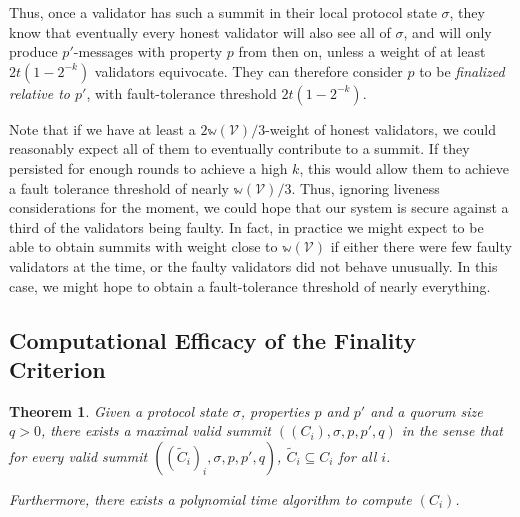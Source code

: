\documentclass[12pt, fleqn]{article}
\newtheorem{theorem}{Theorem}
\newcommand{\ww}{\mathbb{w}}
\begin{document}
Thus, once a validator has such a summit in their local protocol state $\sigma$, they know that eventually every honest validator will also see all of $\sigma$, and will only produce $p'$-messages with property $p$ from then on, unless a weight of at least $2t (1 - 2^{-k})$ validators equivocate. They can therefore consider $p$ to be \emph{finalized relative to $p'$}, with fault-tolerance threshold $2t (1 - 2^{-k})$.

Note that if we have at least a $2\ww(\mathcal{V})/3$-weight of honest validators, we could reasonably expect all of them to eventually contribute to a summit. If they persisted for enough rounds to achieve a high $k$, this would allow them to achieve a fault tolerance threshold of nearly $\ww(\mathcal{V})/3$. Thus, ignoring liveness considerations for the moment, we could hope that our system is secure against a third of the validators being faulty. In fact, in practice we might expect to be able to obtain summits with weight close to $\ww(\mathcal{V})$ if either there were few faulty validators at the time, or the faulty validators did not behave unusually. In this case, we might hope to obtain a fault-tolerance threshold of nearly everything.


\subsection{Computational Efficacy of the Finality Criterion}

\begin{theorem}
  Given a protocol state $\sigma$, properties $p$ and $p'$ and a quorum size $q > 0$, there exists a maximal valid summit $((C_i), \sigma, p, p', q)$ in the sense that for every valid summit $((\tilde{C}_i)_i, \sigma, p, p', q)$, $\tilde{C}_i \subseteq C_i$ for all $i$.

  Furthermore, there exists a polynomial time algorithm to compute $(C_i)$.
\end{theorem}
\end{document}

